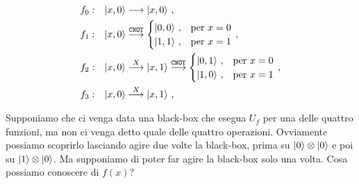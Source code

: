 \begin{align*}
    &f_0: &\ket{x,0} &\longrightarrow \ket{x,0} \, , \\
    &f_1: &\ket{x,0} &\overset{\texttt{CNOT}}{\longrightarrow} 
    \begin{cases}
        \ket{0,0} \, , &\text{per } x = 0 \\
        \ket{1,1} \, , &\text{per } x = 1
    \end{cases} \, , \\
    &f_2: &\ket{x,0} &\overset{X}{\longrightarrow} \ket{x,1} \overset{\texttt{CNOT}}{\longrightarrow}
    \begin{cases}
        \ket{0,1} \, , &\text{per } x = 0 \\
        \ket{1,0} \, , &\text{per } x = 1
    \end{cases} \, , \\
    &f_3: &\ket{x,0} &\overset{X}{\longrightarrow} \ket{x,1} \, , 
\end{align*}

\noindent Supponiamo che ci venga data una black-box che esegua $U_f$ per una delle quattro funzioni, ma non ci venga detto quale delle quattro operazioni. Ovviamente possiamo scoprirlo lasciando agire due volte la black-box, prima su $\ket0 \otimes \ket0$ e poi su $\ket 1 \otimes \ket 0$. Ma supponiamo di poter far agire la black-box solo una volta. Cosa possiamo conoscere di $f(x)$?

